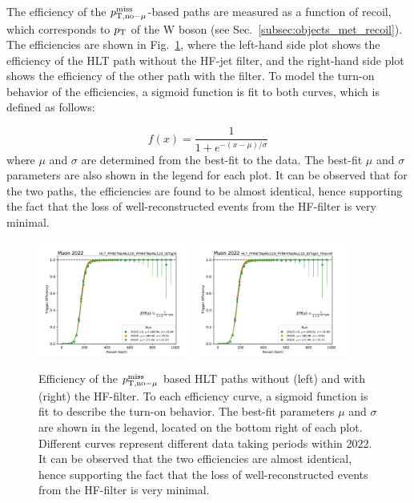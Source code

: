 The efficiency of the $p_{\textrm{T},\textrm{no}-\mu}^{\textrm{miss}}$-based paths are measured as a function of recoil, which corresponds to $p_{\textrm{T}}$ of the W boson (see Sec.~\ref{subsec:objects_met_recoil}). 
The efficiencies are shown in Fig.~\ref{fig:filterhf_efficiency}, where the left-hand side plot shows the efficiency of the HLT path without the HF-jet filter, and the right-hand side plot
shows the efficiency of the other path with the filter. To model the turn-on behavior of the efficiencies, a sigmoid function is fit to both curves, which is defined as follows:

\begin{equation}
    f(x) = \frac{1}{1 + e^{-(x - \mu)/\sigma}}
\end{equation}
where $\mu$ and $\sigma$ are determined from the best-fit to the data. The best-fit $\mu$ and $\sigma$ parameters are also shown in the legend for each plot.
It can be observed that for the two paths, the efficiencies are found to be almost identical, hence
supporting the fact that the loss of well-reconstructed events from the HF-filter is very minimal.  

\begin{figure}[htbp]
    \centering
    \includegraphics[width=0.45\textwidth]{HFFilter/merged_2022-10-27_hlt_Muon_2022_JMEtriggers/turnons_tr_metnomu.pdf}
    \includegraphics[width=0.45\textwidth]{HFFilter/merged_2022-10-27_hlt_Muon_2022_JMEtriggers/turnons_tr_metnomu_filterhf.pdf}
    \caption{Efficiency of the $p_{\textrm{T},\textrm{no}-\mu}^{\textrm{miss}}$ based HLT paths without (left) and with (right) the HF-filter. To each efficiency curve, a sigmoid function is fit
    to describe the turn-on behavior. The best-fit parameters $\mu$ and $\sigma$ are shown in the legend, located on the bottom right of each plot. Different curves
    represent different data taking periods within 2022.
    It can be observed that the two efficiencies are almost identical, hence supporting the fact that the loss of well-reconstructed 
    events from the HF-filter is very minimal.}
    \label{fig:filterhf_efficiency}
\end{figure}

